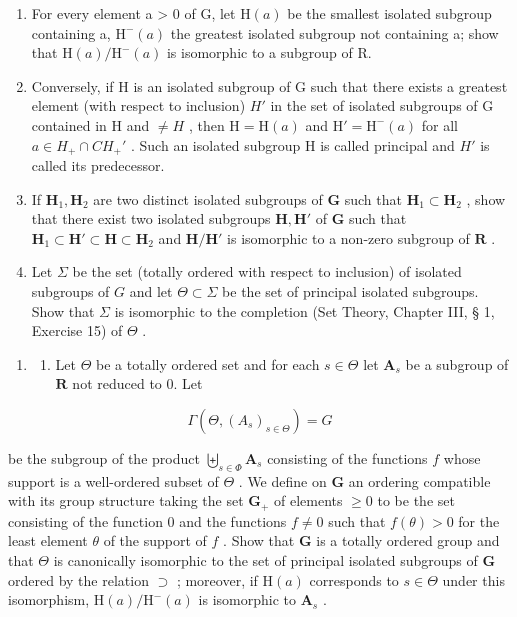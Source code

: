 \begin{enumerate}
\def\labelenumi{(\alph{enumi})}
\item
  For every element a \textgreater{} 0 of G, let \(\mathrm{H}(a)\) be the smallest isolated subgroup containing a, \(\mathrm{H}^{-}(a)\) the greatest isolated subgroup not containing a; show that \(\mathrm{H}(a)/\mathrm{H}^{-}(a)\) is isomorphic to a subgroup of R.
\item
  Conversely, if H is an isolated subgroup of G such that there exists a greatest element (with respect to inclusion) \(H'\) in the set of isolated subgroups of G contained in H and \(\neq H\) , then \(\mathrm{H} = \mathrm{H}(a)\) and \(\mathrm{H}' = \mathrm{H}^{-}(a)\) for all \(a \in H_{+} \cap CH_{+}'\) . Such an isolated subgroup H is called principal and \(H'\) is called its predecessor.
\item
  If \(\mathbf{H}_1, \mathbf{H}_2\) are two distinct isolated subgroups of \(\mathbf{G}\) such that \(\mathbf{H}_1 \subset \mathbf{H}_2\) , show that there exist two isolated subgroups \(\mathbf{H}, \mathbf{H}'\) of \(\mathbf{G}\) such that \(\mathbf{H}_1 \subset \mathbf{H}' \subset \mathbf{H} \subset \mathbf{H}_2\) and \(\mathbf{H} / \mathbf{H}'\) is isomorphic to a non-zero subgroup of \(\mathbf{R}\) .
\item
  Let \(\Sigma\) be the set (totally ordered with respect to inclusion) of isolated subgroups of \(G\) and let \(\Theta \subset \Sigma\) be the set of principal isolated subgroups. Show that \(\Sigma\) is isomorphic to the completion (Set Theory, Chapter III, § 1, Exercise 15) of \(\Theta\) .
\end{enumerate}

\begin{enumerate}
\def\labelenumi{\arabic{enumi}.}
\setcounter{enumi}{2}
\tightlist
\item
  \begin{enumerate}
  \def\labelenumii{(\alph{enumii})}
  \tightlist
  \item
    Let \(\Theta\) be a totally ordered set and for each \(s \in \Theta\) let \(\mathbf{A}_s\) be a subgroup of \(\mathbf{R}\) not reduced to 0. Let
  \end{enumerate}
\end{enumerate}

\[
\Gamma (\Theta , (A _ {s}) _ {s \in \Theta}) = G
\]

be the subgroup of the product \(\biguplus_{s\in\Phi}\mathbf{A}_{s}\) consisting of the functions \(f\) whose support is a well-ordered subset of \(\Theta\) . We define on \(\mathbf{G}\) an ordering compatible with its group structure taking the set \(\mathbf{G}_{+}\) of elements \(\geqslant0\) to be the set consisting of the function 0 and the functions \(f\neq0\) such that \(f(\theta)>0\) for the least element \(\theta\) of the support of \(f\) . Show that \(\mathbf{G}\) is a totally ordered group and that \(\Theta\) is canonically isomorphic to the set of principal isolated subgroups of \(\mathbf{G}\) ordered by the relation \(\supset\) ; moreover, if \(\mathrm{H}(a)\) corresponds to \(s\in\Theta\) under this isomorphism, \(\mathrm{H}(a)/\mathrm{H}^{-}(a)\) is isomorphic to \(\mathbf{A}_{s}\) .

